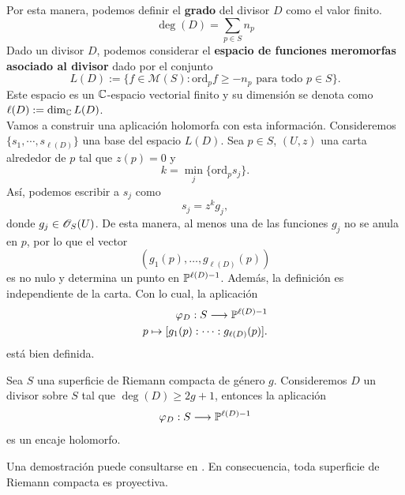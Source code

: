    	Por esta manera, podemos definir el \textbf{grado} del divisor $D$ como el valor finito.
   	\begin{equation*}
   		\deg(D)=\sum_{p\in S} n_p
   	\end{equation*}
   	Dado un divisor $D$, podemos considerar el \textbf{espacio de funciones meromorfas asociado al divisor} dado por el conjunto
   	\begin{equation*}
   		L(D):=\{f\in\mathscr{M}(S):\mathrm{ord}_{p}f\geq -n_p\text{ para todo }p\in S\}.
   	\end{equation*}
   	Este espacio es un $\mathbb{C}$-espacio vectorial finito y su dimensión se denota como $\ell(D):=\dim_{\mathbb{C}}L(D)$.\\
   	Vamos a construir una aplicación holomorfa con esta información. Consideremos $\{s_1,\cdots, s_{\ell(D)}\}$ una base del espacio $L(D)$. Sea $p\in S$, $(U,z)$ una carta alrededor de $p$ tal que $z(p)=0$ y
   	\begin{equation*}
   		k=\min_j\{\mathrm{ord}_ps_j\}.
   	\end{equation*}
   	Así, podemos escribir a $s_j$ como
   	\begin{equation*}
   		s_j=z^kg_j,
   	\end{equation*}
   	donde $g_j\in\mathscr{O}_S(U)$. De esta manera, al menos una de las funciones $g_j$ no se anula en $p$, por lo que el vector
   	\begin{equation*}
   		(g_1(p),\dots,g_{\ell(D)}(p))
   	\end{equation*}
   	es no nulo y determina un punto en $\mathbb{P}^{\ell(D)-1}$. Además, la definición es independiente de la carta. Con lo cual, la aplicación
   	\begin{align*}
   		\varphi_D:S\longrightarrow \mathbb{P}^{\ell(D)-1}\\
   		p\mapsto[g_1(p):\cdots:g_{\ell(D)}(p)].
   	\end{align*}
   	está bien definida.
   	
   	\begin{theorem}\label{encajedesuperficies}
   		Sea $S$ una superficie de Riemann compacta de género $g$. Consideremos $D$ un divisor sobre $S$ tal que $\deg(D)\geq 2g+1$, entonces la aplicación
   		\begin{equation*}
   			\varphi_D:S\longrightarrow \mathbb{P}^{\ell(D)-1}
   		\end{equation*}
   		es un encaje holomorfo.
   	\end{theorem}
   	Una demostración puede consultarse en \parencite[Teo.~5.111]{zaldrimann}. En consecuencia, toda superficie de Riemann compacta es proyectiva.
	
